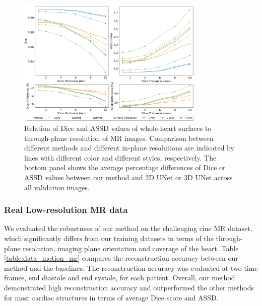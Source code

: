 \documentclass[times,review,preprint,authoryear]{elsarticle}
\begin{document}
\begin{figure}[H]
\centering
\includegraphics[width=0.8\textwidth]{resolution_line2_longi.png}
\caption{Relation of Dice and ASSD values of whole-heart surfaces to through-plane resolution of MR images. Comparison between different methods and different in-plane resolutions are indicated by lines with different color and different styles, respectively. The bottom panel shows the average percentage differences of Dice or ASSD values between our method and 2D UNet or 3D UNet across all validation images. } 
\label{figure:resolution_line}
\end{figure}


\subsubsection{Real Low-resolution MR data}
We evaluated the robustness of our method on the challenging cine MR dataset, which significantly differs from our training datasets in terms of the through-plane resolution, imaging plane orientation and coverage of the heart. Table \ref{table:data_motion_mr} compares the reconstruction accuracy between our method and the baselines. The reconstruction accuracy was evaluated at two time frames, end diastole and end systole, for each patient. Overall, our method demonstrated high reconstruction accuracy and outperformed the other methods for most cardiac structures in terms of average Dice score and ASSD. 
\end{document}
